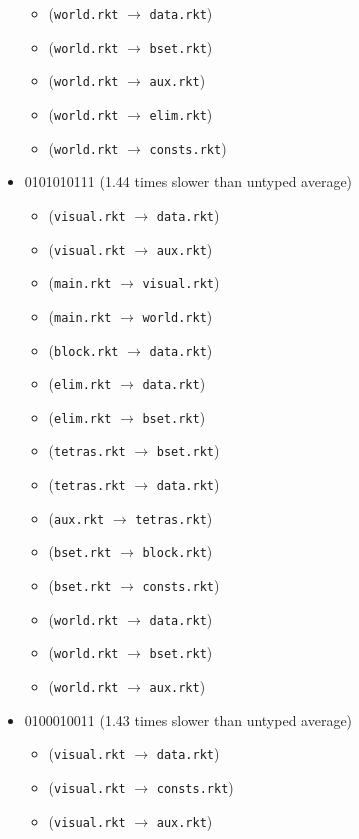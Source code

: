 \documentclass{article}
\newcommand{\mono}[1]{\texttt{#1}}
\begin{document}
\begin{itemize}
\begin{itemize}
  \item (\mono{world.rkt} $\rightarrow$ \mono{data.rkt})
  \item (\mono{world.rkt} $\rightarrow$ \mono{bset.rkt})
  \item (\mono{world.rkt} $\rightarrow$ \mono{aux.rkt})
  \item (\mono{world.rkt} $\rightarrow$ \mono{elim.rkt})
  \item (\mono{world.rkt} $\rightarrow$ \mono{consts.rkt})
  \end{itemize}
\item 0101010111 (1.44 times slower than untyped average)
  \begin{itemize}
  \item (\mono{visual.rkt} $\rightarrow$ \mono{data.rkt})
  \item (\mono{visual.rkt} $\rightarrow$ \mono{aux.rkt})
  \item (\mono{main.rkt} $\rightarrow$ \mono{visual.rkt})
  \item (\mono{main.rkt} $\rightarrow$ \mono{world.rkt})
  \item (\mono{block.rkt} $\rightarrow$ \mono{data.rkt})
  \item (\mono{elim.rkt} $\rightarrow$ \mono{data.rkt})
  \item (\mono{elim.rkt} $\rightarrow$ \mono{bset.rkt})
  \item (\mono{tetras.rkt} $\rightarrow$ \mono{bset.rkt})
  \item (\mono{tetras.rkt} $\rightarrow$ \mono{data.rkt})
  \item (\mono{aux.rkt} $\rightarrow$ \mono{tetras.rkt})
  \item (\mono{bset.rkt} $\rightarrow$ \mono{block.rkt})
  \item (\mono{bset.rkt} $\rightarrow$ \mono{consts.rkt})
  \item (\mono{world.rkt} $\rightarrow$ \mono{data.rkt})
  \item (\mono{world.rkt} $\rightarrow$ \mono{bset.rkt})
  \item (\mono{world.rkt} $\rightarrow$ \mono{aux.rkt})
  \end{itemize}
\item 0100010011 (1.43 times slower than untyped average)
  \begin{itemize}
  \item (\mono{visual.rkt} $\rightarrow$ \mono{data.rkt})
  \item (\mono{visual.rkt} $\rightarrow$ \mono{consts.rkt})
  \item (\mono{visual.rkt} $\rightarrow$ \mono{aux.rkt})

\end{itemize}
\end{itemize}
\end{document}
